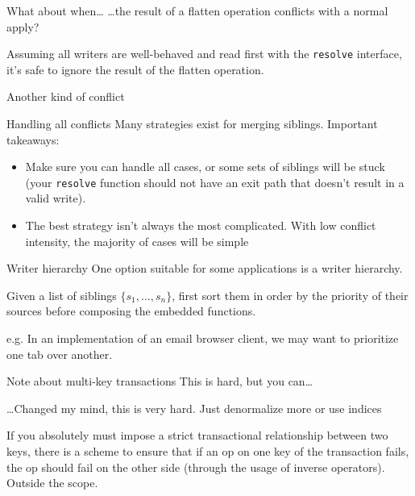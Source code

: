 \documentclass[17pt]{beamer}
\begin{document}
\begin{frame}{What about when\dots}
  \dots the result of a flatten operation conflicts with a normal apply?
  \pause

  Assuming all writers are well-behaved and read first with the
  \texttt{resolve} interface, it's safe to ignore the result of the
  flatten operation.
\end{frame}
\begin{frame}{Another kind of conflict}
\end{frame}
\begin{frame}{Handling all conflicts}
  Many strategies exist for merging siblings. Important takeaways:
  \pause
  \begin{itemize}
    \item Make sure you can handle all cases, or some sets of siblings
      will be stuck (your \texttt{resolve} function should not have an
      exit path that doesn't result in a valid write). \pause
    \item The best strategy isn't always the most complicated. With
      low conflict intensity, the majority of cases will be simple
  \end{itemize}
\end{frame}
\begin{frame}{Writer hierarchy}
  One option suitable for some applications is a writer hierarchy.
  \pause

  Given a list of siblings $\{s_1, \dots, s_n\}$, first sort them in
  order by the priority of their sources before composing the embedded
  functions. \pause

  e.g. In an implementation of an email browser client, we may want to
  prioritize one tab over another.
\end{frame}
\begin{frame}{Note about multi-key transactions}
  This is hard, but you can\dots \pause

  \dots Changed my mind, this is very hard. Just denormalize more or
  use indices \pause

  If you absolutely must impose a strict transactional relationship
  between two keys, there is a scheme to ensure that if an op on one
  key of the transaction fails, the op should fail on the other side
  (through the usage of inverse operators). Outside the scope.
\end{frame}
\end{document}
